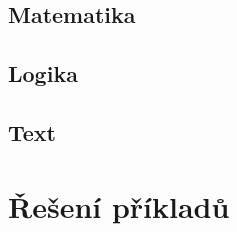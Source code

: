 \subsection*{Matematika }
\begin{itemize}
	\blockMathOperation
	\blockMathTest
	\blockMathValue
	\blockMathConstant
	\blockMathRandom
\end{itemize}

\subsection*{Logika }
\begin{itemize}
	\blockLogicTrue
	\blockLogicFalse
	\blockLogicIf
	\blockLogicIfElse
	\blockLogicComparison
	\blockLogicOperator
\end{itemize}

\subsection*{Text }
\begin{itemize}
	\blockString
	\blockDisplayPrint
	\blockDisplayClear
\end{itemize}

\newpage

\section{Řešení příkladů}\label{cha:sol}

\printsolutions

\newpage

\nocite{*}
\printbibliography[title={Zdroje}]

